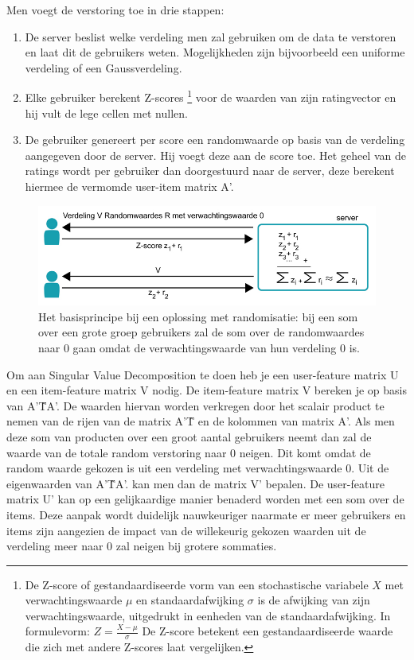 Men voegt de verstoring toe in drie stappen:
\begin{enumerate}
\item De server beslist welke verdeling men zal gebruiken om de data te verstoren en laat dit de gebruikers weten. Mogelijkheden zijn bijvoorbeeld een uniforme verdeling of een Gaussverdeling.
\item Elke gebruiker berekent Z-scores \footnote{De Z-score of gestandaardiseerde vorm van een stochastische variabele $X$ met verwachtingswaarde $\mu$ en standaardafwijking $\sigma$ is de afwijking van zijn verwachtingswaarde, uitgedrukt in eenheden van de standaardafwijking. In formulevorm:
$Z=\frac{X-\mu}{\sigma}$
De Z-score betekent een gestandaardiseerde waarde die zich met andere Z-scores laat vergelijken.

} voor de waarden van zijn ratingvector en hij vult de lege cellen met nullen.
\item De gebruiker genereert per score een randomwaarde op basis van de verdeling aangegeven door de server. Hij voegt deze aan de score toe. Het geheel van de ratings wordt per gebruiker dan doorgestuurd naar de server, deze berekent hiermee de vermomde user-item matrix A’.
\end{enumerate}
\begin{figure}[htpb]   
    \label{Figuur::randomisatiefig}      
  \begin{center}    
 \includegraphics[scale=0.5]{fig/randomisatie}    
  \end{center}   
  \caption{Het basisprincipe bij een oplossing met randomisatie: bij een som over een grote groep gebruikers zal de som over de randomwaardes naar 0 gaan omdat de verwachtingswaarde van hun verdeling 0 is.}  
   \end{figure}
Om aan Singular Value Decomposition te doen heb je een user-feature matrix U en een item-feature matrix V nodig. De item-feature matrix V bereken je op basis van A’\^TA’. De waarden hiervan worden verkregen door het scalair product te nemen van de rijen van de matrix A’\^T en de kolommen van matrix A’. Als men deze som van producten over een groot aantal gebruikers neemt dan zal de waarde van de totale random verstoring naar 0 neigen. Dit komt omdat de random waarde gekozen is uit een verdeling met verwachtingswaarde 0. Uit de eigenwaarden van A’\^TA’. kan men dan de matrix V’ bepalen. De user-feature matrix U’ kan op een gelijkaardige manier benaderd worden met een som over de items. Deze aanpak wordt duidelijk nauwkeuriger naarmate er meer gebruikers en items zijn aangezien de impact van de willekeurig gekozen waarden uit de verdeling meer naar 0 zal neigen bij grotere sommaties.

